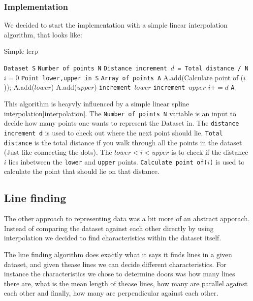 \documentclass[a4paper, 10pt, conference]{ieeeconf}      %
\begin{document}
\subsubsection{Implementation}
We decided to start the implementation with a simple linear interpolation algorithm, that looks like:

\begin{algorithm}
  \caption{Simple lerp}\label{lerp}
  \begin{algorithmic}[1]
      \State \texttt{Dataset S}
      \State \texttt{Number of points N}
      \State \texttt{Distance increment $d$ = Total distance / N}
      \State \texttt{$i = 0$}
      \State \texttt{Point lower,upper in S}
      \State \texttt{Array of points A}
      		\State A.add(Calculate point of ($i$));
      		\State A.add($lower$)
      		\State A.add($upper$)
      	\Else
      			\State \texttt{increment $lower$}
      			\State \texttt{increment $upper$}
      		\EndWhile
      	\EndIf
      	\State \texttt{$i += d$}
      \EndWhile
      \Return \texttt{A}
  \end{algorithmic}
\end{algorithm}

This algorithm is heayvly influenced by a simple linear spline interpolation\ref{interpolation}. The \texttt{Number of points N} variable is an input to decide how many points one wants to represent the Dataset in. The \texttt{distance increment d} is used to check out where the next point should lie. \texttt{Total distance} is the total distance if you walk through all the points in the dataset (Just like connecting the dots). The \texttt{$lower < i < upper$} is to check if the distance $i$ lies inbetween the \texttt{lower} and \texttt{upper} points. \texttt{Calculate point of($i$)} is used to calculate the point that should lie on that distance.

\subsection{Line finding}
\label{sec:line_find}
The other approach to representing data was a bit more of an abstract apporach. Instead of comparing the dataset against each other directly by using interpolation we decided to find characteristics within the dataset itself. 

The line finding algorithm does exactly what it says it finds lines in a given dataset, and given thease lines we can decide different characteristics. For instance the characteristics we chose to determine doors was how many lines there are, what is the mean length of thease lines, how many are parallel against each other and finally, how many are perpendicular against each other.
\end{document}
